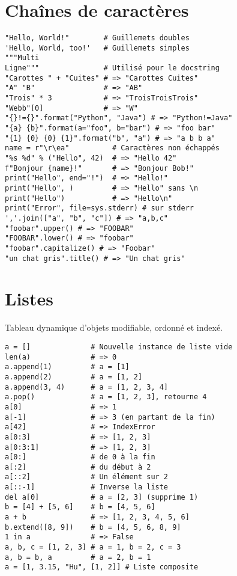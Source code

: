 \documentclass[9pt]{extarticle}
\begin{document}
\begin{multicols*}{4}
\section*{Chaînes de caractères}

\begin{lstlisting}
"Hello, World!"        # Guillemets doubles
'Hello, World, too!'   # Guillemets simples
"""Multi
Ligne"""               # Utilisé pour le docstring
"Carottes " + "Cuites" # => "Carottes Cuites"
"A" "B"                # => "AB"
"Trois" * 3            # => "TroisTroisTrois"
"Webb"[0]              # => "W"
"{}!={}".format("Python", "Java") # => "Python!=Java"
"{a} {b}".format(a="foo", b="bar") # => "foo bar"
"{1} {0} {0} {1}".format("b", "a") # => "a b b a"
name = r"\r\ea"          # Caractères non échappés
"%s %d" % ("Hello", 42)  # => "Hello 42"
f"Bonjour {name}!"       # => "Bonjour Bob!"
print("Hello", end="!")  # => "Hello!"
print("Hello", )         # => "Hello" sans \n
print("Hello")           # => "Hello\n"
print("Error", file=sys.stderr) # sur stderr
','.join(["a", "b", "c"]) # => "a,b,c"
"foobar".upper() # => "FOOBAR"
"FOOBAR".lower() # => "foobar"
"foobar".capitalize() # => "Foobar"
"un chat gris".title() # => "Un chat gris"

\end{lstlisting}

\section*{Listes}
Tableau dynamique d'objets modifiable, ordonné et indexé.
\begin{lstlisting}
a = []              # Nouvelle instance de liste vide
len(a)              # => 0
a.append(1)         # a = [1]
a.append(2)         # a = [1, 2]
a.append(3, 4)      # a = [1, 2, 3, 4]
a.pop()             # a = [1, 2, 3], retourne 4
a[0]                # => 1
a[-1]               # => 3 (en partant de la fin)
a[42]               # => IndexError
a[0:3]              # => [1, 2, 3]
a[0:3:1]            # => [1, 2, 3]
a[0:]               # de 0 à la fin
a[:2]               # du début à 2
a[::2]              # Un élément sur 2
a[::-1]             # Inverse la liste
del a[0]            # a = [2, 3] (supprime 1)
b = [4] + [5, 6]    # b = [4, 5, 6]
a + b               # => [1, 2, 3, 4, 5, 6]
b.extend([8, 9])    # b = [4, 5, 6, 8, 9]
1 in a              # => False
a, b, c = [1, 2, 3] # a = 1, b = 2, c = 3
a, b = b, a         # a = 2, b = 1
a = [1, 3.15, "Hu", [1, 2]] # Liste composite
\end{lstlisting}


\end{multicols*}
\end{document}
